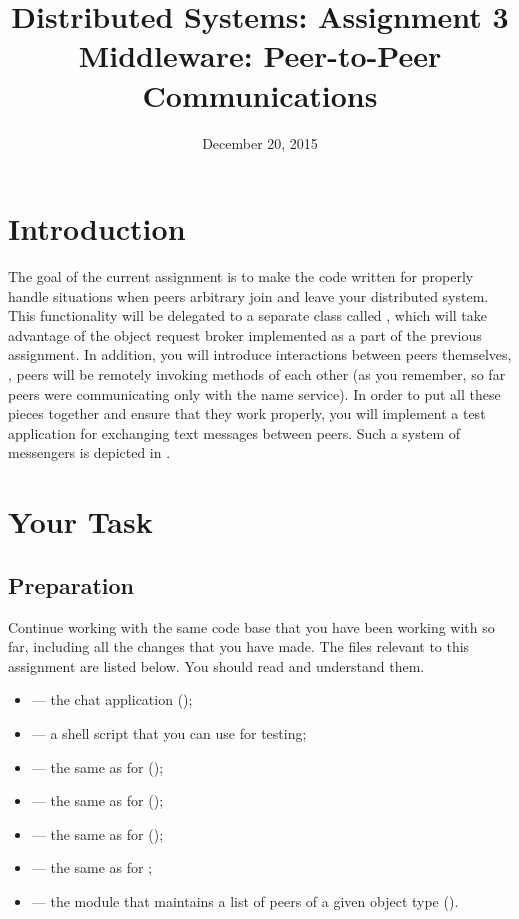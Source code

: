 \documentclass[a4paper]{article}
\title{Distributed Systems: Assignment 3\\Middleware: Peer-to-Peer
Communications}
\author{}
\date{December 20, 2015}
\begin{document}
\maketitle

\section{Introduction}

The goal of the current assignment is to make the code written for 
properly handle situations when peers arbitrary join and leave your distributed
system. This functionality will be delegated to a separate class called
, which will take advantage of the object request broker
implemented as a part of the previous assignment. In addition, you will
introduce interactions between peers themselves, \ie, peers will be remotely
invoking methods \cite{lecture3} of each other (as you remember, so far peers
were communicating only with the name service). In order to put all these pieces
together and ensure that they work properly, you will implement a test
application for exchanging text messages between peers. Such a system of
messengers is depicted in .

\section{Your Task}
\subsection{Preparation}
Continue working with the same code base that you have been working with so far,
including all the changes that you have made. The files relevant to this
assignment are listed below. You should read and understand them.
\begin{itemize}

  \item {} --- the chat application (\leave);

  \item {} --- a shell script that you can use for testing;

  \item {} --- the same as for
   (\leave);

  \item {} --- the same as for 
  (\overwrite);

  \item {} --- the same as for 
  (\overwrite);

  \item {} --- the same as for ;

  \item {} --- the module that maintains a
  list of peers of a given object type (\fix).

\end{itemize}
\end{document}
